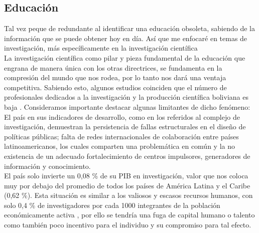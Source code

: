 \documentclass[10pt]{book}
\begin{document}
\begin{multicols}{2}
\subsection*{Educación}
Tal vez peque de redundante al identificar una educación obsoleta, sabiendo de la información que se puede obtener hoy en día. Así que me enfocaré en temas de investigación, más específicamente en la investigación científica\\
La investigación científica como pilar y pieza fundamental de la educación que engrana de manera única con los otras directrices, se fundamenta en la compresión del mundo que nos rodea, por lo tanto nos dará una ventaja competitiva. Sabiendo esto, algunos estudios coinciden que el número de profesionales dedicados a la investigación y la producción científica boliviana es baja \cite{uno}. Consideramos importante destacar algunas limitantes de dicho fenómeno: El país en sus indicadores de desarrollo, como en los referidos al complejo de investigación, demuestran la persistencia de fallas estructurales en el diseño de políticas públicas; falta de redes internacionales de colaboración entre países latinoamericanos, los cuales comparten una problemática en común y la no existencia de un adecuado fortalecimiento de centros impulsores, generadores de información y conocimiento.\\
El país solo invierte un 0,08 \% de su PIB en investigación, valor que nos coloca muy por debajo del promedio de todos los países de América Latina y el Caribe (0,62 \%). Esta situación es similar a los valiosos y escasos recursos humanos, con solo 0,4 \% de investigadores por cada 1000 integrantes de la población económicamente activa \cite{dos}, por ello se tendría una fuga de capital humano o talento como también poco incentivo para el individuo y su compromiso para tal efecto. 


\end{multicols}
\end{document}
